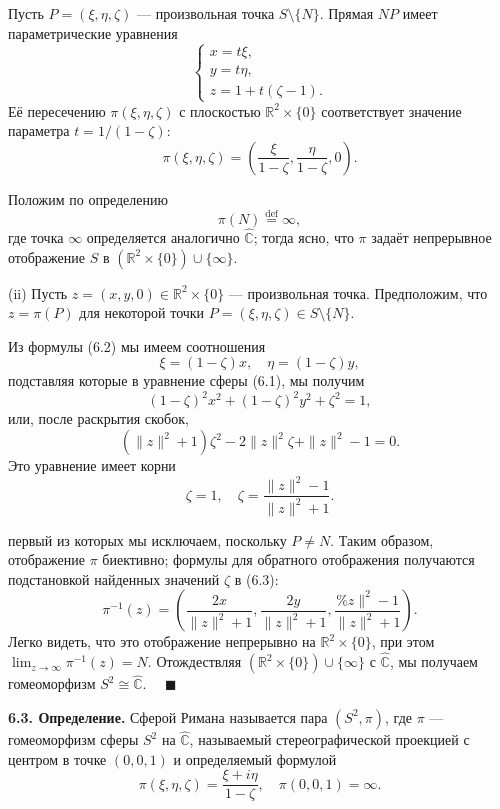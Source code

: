 \documentclass[12pt, a4paper]{article}
\theoremstyle{definition}
\theoremstyle{remark}
\begin{document}
Пусть $P = (\xi, \eta, \zeta)$ --- произвольная точка $S \setminus \{N\}$. Прямая $NP$ имеет параметрические уравнения
\[
\begin{cases}
	x = t\xi, \\
	y = t\eta, \\
	z = 1 + t(\zeta - 1).
\end{cases}
\]
Её пересечению $\pi(\xi, \eta, \zeta)$ с плоскостью $\mathbb{R}^2 \times \{0\}$ соответствует значение параметра $t = 1/(1 - \zeta)$:
\begin{equation}\tag{6.2}
	\pi(\xi, \eta, \zeta) = \left( \frac{\xi}{1 - \zeta}, \frac{\eta}{1 - \zeta}, 0 \right).
\end{equation}

Положим по определению
\[
\pi(N) \stackrel{\text{def}}{=} \infty,
\]
где точка $\infty$ определяется аналогично $\hat{\mathbb{C}}$; тогда ясно, что $\pi$ задаёт непрерывное отображение $S$ в $(\mathbb{R}^2 \times \{0\}) \cup \{\infty\}$.

(ii) Пусть $z = (x, y, 0) \in \mathbb{R}^2 \times \{0\}$ --- произвольная точка. Предположим, что $z = \pi(P)$ для некоторой точки $P = (\xi, \eta, \zeta) \in S \setminus \{N\}$.

Из формулы (6.2) мы имеем соотношения
\begin{equation}\tag{6.3}
	\xi = (1 - \zeta)x, \quad \eta = (1 - \zeta)y,
\end{equation}
подставляя которые в уравнение сферы (6.1), мы получим
\[
(1 - \zeta)^2 x^2 + (1 - \zeta)^2 y^2 + \zeta^2 = 1,
\]
или, после раскрытия скобок,
\[
(\|z\|^2 + 1)\zeta^2 - 2\|z\|^2\zeta + \|z\|^2 - 1 = 0.
\]
Это уравнение имеет корни
\[
\zeta = 1, \quad \zeta = \frac{\|z\|^2 - 1}{\|z\|^2 + 1}.
\]

первый из которых мы исключаем, поскольку $P \neq N$. Таким образом, отображение $\pi$ биективно; формулы для обратного отображения получаются подстановкой найденных значений $\zeta$ в (6.3):
\[
\pi^{-1}(z) = \left( \frac{2x}{\|z\|^2 + 1}, \frac{2y}{\|z\|^2 + 1}, \frac{\%z\|^2 - 1}{\|z\|^2 + 1} \right).
\]
Легко видеть, что это отображение непрерывно на $\mathbb{R}^2 \times \{0\}$, при этом $\lim_{z \to \infty} \pi^{-1}(z) = N$. Отождествляя $(\mathbb{R}^2 \times \{0\}) \cup \{\infty\}$ с $\hat{\mathbb{C}}$, мы получаем гомеоморфизм $S^2 \cong \hat{\mathbb{C}}$. $\quad \blacksquare$

\textbf{6.3. Определение.} Сферой Римана называется пара $(S^2, \pi)$, где $\pi$ --- гомеоморфизм сферы $S^2$ на $\hat{\mathbb{C}}$, называемый стереографической проекцией с центром в точке $(0,0,1)$ и определяемый формулой
\[
\pi(\xi, \eta, \zeta) = \frac{\xi + i\eta}{1 - \zeta}, \quad \pi(0,0,1) = \infty.
\]
\end{document}
